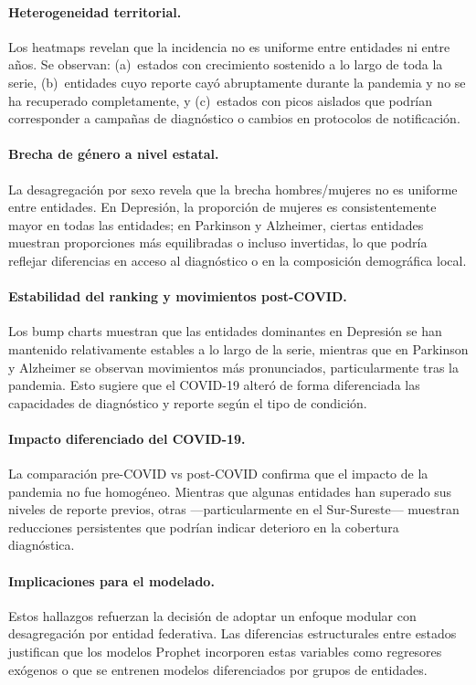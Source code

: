 \documentclass[12pt,letterpaper]{article}
\begin{document}
\paragraph{Heterogeneidad territorial.}
Los heatmaps revelan que la incidencia no es uniforme entre entidades ni entre años. Se observan: (a)~estados con crecimiento sostenido a lo largo de toda la serie, (b)~entidades cuyo reporte cayó abruptamente durante la pandemia y no se ha recuperado completamente, y (c)~estados con picos aislados que podrían corresponder a campañas de diagnóstico o cambios en protocolos de notificación.

\paragraph{Brecha de género a nivel estatal.}
La desagregación por sexo revela que la brecha hombres/mujeres no es uniforme entre entidades. En Depresión, la proporción de mujeres es consistentemente mayor en todas las entidades; en Parkinson y Alzheimer, ciertas entidades muestran proporciones más equilibradas o incluso invertidas, lo que podría reflejar diferencias en acceso al diagnóstico o en la composición demográfica local.

\paragraph{Estabilidad del ranking y movimientos post-COVID.}
Los bump charts muestran que las entidades dominantes en Depresión se han mantenido relativamente estables a lo largo de la serie, mientras que en Parkinson y Alzheimer se observan movimientos más pronunciados, particularmente tras la pandemia. Esto sugiere que el COVID-19 alteró de forma diferenciada las capacidades de diagnóstico y reporte según el tipo de condición.

\paragraph{Impacto diferenciado del COVID-19.}
La comparación pre-COVID vs post-COVID confirma que el impacto de la pandemia no fue homogéneo. Mientras que algunas entidades han superado sus niveles de reporte previos, otras ---particularmente en el Sur-Sureste--- muestran reducciones persistentes que podrían indicar deterioro en la cobertura diagnóstica.

\paragraph{Implicaciones para el modelado.}
Estos hallazgos refuerzan la decisión de adoptar un enfoque modular con desagregación por entidad federativa. Las diferencias estructurales entre estados justifican que los modelos Prophet incorporen estas variables como regresores exógenos o que se entrenen modelos diferenciados por grupos de entidades.
\end{document}
